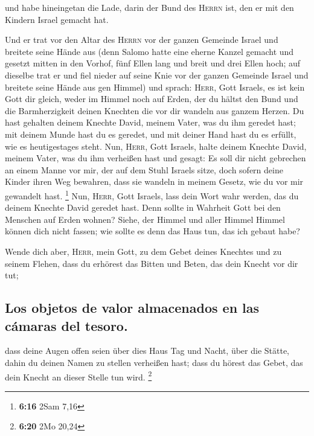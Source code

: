  und habe hineingetan die Lade, darin der Bund des
\textsc{Herrn} ist, den er mit den Kindern Israel gemacht hat.

 Und er trat vor den Altar des \textsc{Herrn} vor der
ganzen Gemeinde Israel und breitete seine Hände aus 
(denn Salomo hatte eine eherne Kanzel gemacht und gesetzt mitten in den
Vorhof, fünf Ellen lang und breit und drei Ellen hoch; auf dieselbe trat
er und fiel nieder auf seine Knie vor der ganzen Gemeinde Israel und
breitete seine Hände aus gen Himmel)  und sprach:
\textsc{Herr}, Gott Israels, es ist kein Gott dir gleich, weder im
Himmel noch auf Erden, der du hältst den Bund und die Barmherzigkeit
deinen Knechten die vor dir wandeln aus ganzem Herzen. 
Du hast gehalten deinem Knechte David, meinem Vater, was du ihm geredet
hast; mit deinem Munde hast du es geredet, und mit deiner Hand hast du
es erfüllt, wie es heutigestages steht.  Nun,
\textsc{Herr}, Gott Israels, halte deinem Knechte David, meinem Vater,
was du ihm verheißen hast und gesagt: Es soll dir nicht gebrechen an
einem Manne vor mir, der auf dem Stuhl Israels sitze, doch sofern deine
Kinder ihren Weg bewahren, dass sie wandeln in meinem Gesetz, wie du vor
mir gewandelt hast. \footnote{\textbf{6:16} 2Sam 7,16} 
Nun, \textsc{Herr}, Gott Israels, lass dein Wort wahr werden, das du
deinem Knechte David geredet hast.  Denn sollte in
Wahrheit Gott bei den Menschen auf Erden wohnen? Siehe, der Himmel und
aller Himmel Himmel können dich nicht fassen; wie sollte es denn das
Haus tun, das ich gebaut habe?

 Wende dich aber, \textsc{Herr}, mein Gott, zu dem Gebet
deines Knechtes und zu seinem Flehen, dass du erhörest das Bitten und
Beten, das dein Knecht vor dir tut;

\hypertarget{los-objetos-de-valor-almacenados-en-las-cuxe1maras-del-tesoro.}{%
\subsection{Los objetos de valor almacenados en las cámaras del
tesoro.}\label{los-objetos-de-valor-almacenados-en-las-cuxe1maras-del-tesoro.}}

 dass deine Augen offen seien über dies Haus Tag und
Nacht, über die Stätte, dahin du deinen Namen zu stellen verheißen hast;
dass du hörest das Gebet, das dein Knecht an dieser Stelle tun wird.
\footnote{\textbf{6:20} 2Mo 20,24}

